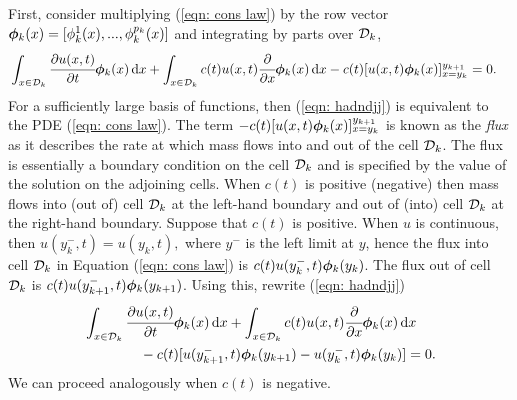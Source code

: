 First, consider multiplying (\ref{eqn: cons law}) by the row vector \(\boldsymbol \phi_k(x)=[\phi_k^1(x),...,\phi_k^{p_k}(x)]\) and integrating by parts over \(\mathcal{D}_k\),
\begin{align}
	&\int_{x\in \mathcal{D}_k}\cfrac{\partial u(x,t)}{\partial t}\boldsymbol\phi_k(x)\, \mathrm{d} x + \int_{x\in \mathcal{D}_k} c(t) u(x,t)\cfrac{\partial}{\partial x} \boldsymbol \phi_k( x)\, \mathrm{d} x - c(t)[u(x,t)\boldsymbol \phi_k(x)]_{x=y_k}^{y_{k+1}} = 0.\label{eqn: hadndjj}
\end{align}
For a sufficiently large basis of functions, then (\ref{eqn: hadndjj}) is equivalent to the PDE (\ref{eqn: cons law}). The term \(- c(t)[u(x,t)\boldsymbol \phi_k(x)]_{x=y_k}^{y_{k+1}}\) is known as the \emph{flux} as it describes the rate at which mass flows into and out of the cell \(\mathcal{D}_k\). The flux is essentially a boundary condition on the cell \(\mathcal{D}_k\) and is specified by the value of the solution on the adjoining cells. When \(c(t)\) is positive (negative) then mass flows into (out of) cell \(\mathcal{D}_k\) at the left-hand boundary and out of (into) cell \(\mathcal{D}_k\) at the right-hand boundary. Suppose that \(c(t)\) is positive. When \(u\) is continuous, then \(u(y_{k}^-,t)=u(y_k,t),\) where \(y^-\) is the left limit at \(y\), hence the flux into cell \(\mathcal{D}_k\) in Equation (\ref{eqn: cons law}) is \(c(t)u(y_k^-,t)\boldsymbol \phi_k(y_k)\). The flux out of cell \(\mathcal{D}_k\) is \(c(t)u(y_{k+1}^-,t)\boldsymbol \phi_k(y_{k+1})\). Using this, rewrite (\ref{eqn: hadndjj})
\begin{align}
	&\int_{x\in \mathcal{D}_k}\cfrac{\partial u(x,t)}{\partial t}\boldsymbol\phi_k(x)\, \mathrm{d} x + \int_{x\in \mathcal{D}_k} c(t) u(x,t)\cfrac{\partial}{\partial x} \boldsymbol \phi_k( x)\, \mathrm{d} x \nonumber
	\\&\qquad\qquad{}- c(t)[u(y_{k+1}^-,t)\boldsymbol \phi_k(y_{k+1}) - u(y_{k}^-,t)\boldsymbol \phi_k(y_{k})] = 0.\label{eqn: hadndjjj}
\end{align}
We can proceed analogously when \(c(t)\) is negative. 


